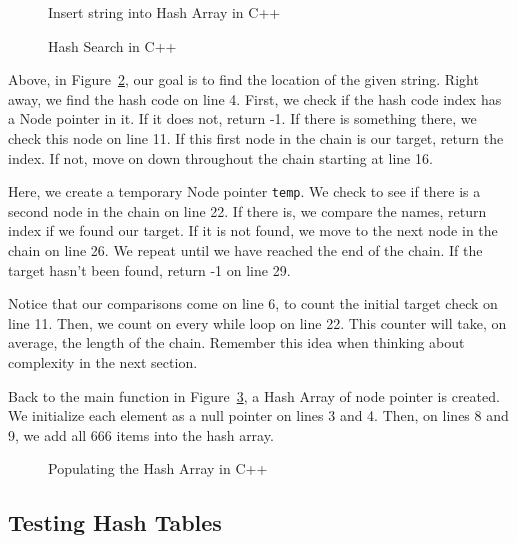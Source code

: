 \documentclass[letterpaper, 10pt,DIV=13]{scrartcl}
\numberwithin{equation}{section} %
\numberwithin{figure}{section} %
\numberwithin{table}{section} %
\begin{document}
\begin{figure}[ht] 
    \centering 
    
    \caption{Insert string into Hash Array in C++}
    \label{figure:Insert}
\end{figure}

\pagebreak

\begin{figure}[ht] 
    \centering 
    
    \caption{Hash Search in C++}
    \label{figure:HashSearch}
\end{figure}

Above, in Figure~\ref{figure:HashSearch}, our goal is to find the location of the given string. Right away, we find the hash code on line 4. First, we check if the hash code index has a Node pointer in it. If it does not, return -1. If there is something there, we check this node on line 11. If this first node in the chain is our target, return the index. If not, move on down throughout the chain starting at line 16.

Here, we create a temporary Node pointer \texttt{temp}. We check to see if there is a second node in the chain on line 22. If there is, we compare the names, return index if we found our target. If it is not found, we move to the next node in the chain on line 26. We repeat until we have reached the end of the chain. If the target hasn't been found, return -1 on line 29.

Notice that our comparisons come on line 6, to count the initial target check on line 11. Then, we count on every while loop on line 22. This counter will take, on average, the length of the chain. Remember this idea when thinking about complexity in the next section.

\pagebreak

Back to the main function in Figure~\ref{figure:Populate}, a Hash Array of node pointer is created. We initialize each element as a null pointer on lines 3 and 4. Then, on lines 8 and 9, we add all 666 items into the hash array.


\begin{figure}[ht] 
    \centering 
    
    \caption{Populating the Hash Array in C++}
    \label{figure:Populate}
\end{figure}



\subsection{Testing Hash Tables}
\end{document}
